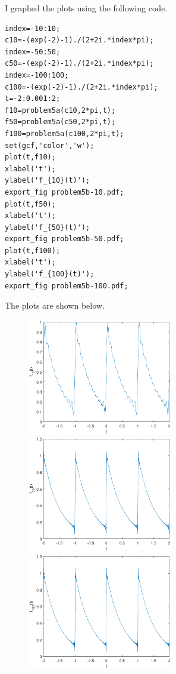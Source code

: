 \documentclass[12pt]{article}
\begin{document}
I graphed the plots using the following code.
\begin{verbatim}
index=-10:10;
c10=-(exp(-2)-1)./(2+2i.*index*pi);
index=-50:50;
c50=-(exp(-2)-1)./(2+2i.*index*pi);
index=-100:100;
c100=-(exp(-2)-1)./(2+2i.*index*pi);
t=-2:0.001:2;
f10=problem5a(c10,2*pi,t);
f50=problem5a(c50,2*pi,t);
f100=problem5a(c100,2*pi,t);
set(gcf,'color','w');
plot(t,f10);
xlabel('t');
ylabel('f_{10}(t)');
export_fig problem5b-10.pdf;
plot(t,f50);
xlabel('t');
ylabel('f_{50}(t)');
export_fig problem5b-50.pdf;
plot(t,f100);
xlabel('t');
ylabel('f_{100}(t)');
export_fig problem5b-100.pdf;
\end{verbatim}
The plots are shown below.
\begin{figure}[H]
    \begin{center}
        \includegraphics[width=2.5in]{problem5b-10.pdf}
        \includegraphics[width=2.5in]{problem5b-50.pdf}
        \includegraphics[width=2.5in]{problem5b-100.pdf}
    \end{center}
\end{figure}
\end{document}
